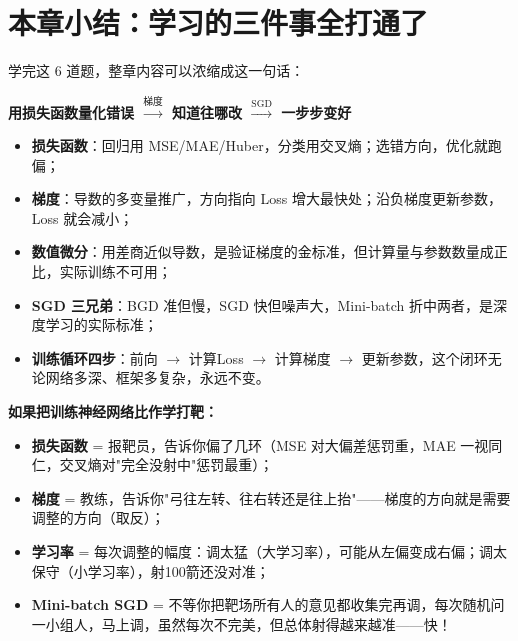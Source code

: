 \documentclass[a4paper,11pt]{ctexart}
\begin{document}
\section{本章小结：学习的三件事全打通了}

学完这 6 道题，整章内容可以浓缩成这一句话：

\begin{center}
    \textbf{用损失函数量化错误 $\xrightarrow{\text{梯度}}$ 知道往哪改 $\xrightarrow{\text{SGD}}$ 一步步变好}
\end{center}

\begin{itemize}
    \item \textbf{损失函数}：回归用 MSE/MAE/Huber，分类用交叉熵；选错方向，优化就跑偏；
    \item \textbf{梯度}：导数的多变量推广，方向指向 Loss 增大最快处；沿负梯度更新参数，Loss 就会减小；
    \item \textbf{数值微分}：用差商近似导数，是验证梯度的金标准，但计算量与参数数量成正比，实际训练不可用；
    \item \textbf{SGD 三兄弟}：BGD 准但慢，SGD 快但噪声大，Mini-batch 折中两者，是深度学习的实际标准；
    \item \textbf{训练循环四步}：前向 $\to$ 计算Loss $\to$ 计算梯度 $\to$ 更新参数，这个闭环无论网络多深、框架多复杂，永远不变。
\end{itemize}

\begin{metaphorbox}[给零基础读者的一句总比喻]
    \textbf{如果把训练神经网络比作学打靶：}
    \begin{itemize}
        \item \textbf{损失函数} = 报靶员，告诉你偏了几环（MSE 对大偏差惩罚重，MAE 一视同仁，交叉熵对"完全没射中"惩罚最重）；
        \item \textbf{梯度} = 教练，告诉你"弓往左转、往右转还是往上抬"——梯度的方向就是需要调整的方向（取反）；
        \item \textbf{学习率} = 每次调整的幅度：调太猛（大学习率），可能从左偏变成右偏；调太保守（小学习率），射100箭还没对准；
        \item \textbf{Mini-batch SGD} = 不等你把靶场所有人的意见都收集完再调，每次随机问一小组人，马上调，虽然每次不完美，但总体射得越来越准——快！
    \end{itemize}
\end{metaphorbox}
\end{document}

